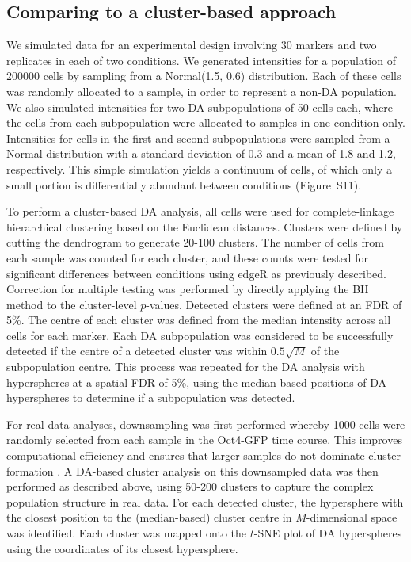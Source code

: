 \documentclass{article}
\newcommand{\suppfigclustersim}{S11}
\begin{document}
\subsection{Comparing to a cluster-based approach}
We simulated data for an experimental design involving 30 markers and two replicates in each of two conditions.
We generated intensities for a population of 200000 cells by sampling from a Normal(1.5, 0.6) distribution.
Each of these cells was randomly allocated to a sample, in order to represent a non-DA population.
We also simulated intensities for two DA subpopulations of 50 cells each, where the cells from each subpopulation were allocated to samples in one condition only.
Intensities for cells in the first and second subpopulations were sampled from a Normal distribution with a standard deviation of 0.3 and a mean of 1.8 and 1.2, respectively.
This simple simulation yields a continuum of cells, of which only a small portion is differentially abundant between conditions (Figure~\suppfigclustersim{}).

To perform a cluster-based DA analysis, all cells were used for complete-linkage hierarchical clustering based on the Euclidean distances.
Clusters were defined by cutting the dendrogram to generate 20-100 clusters.
The number of cells from each sample was counted for each cluster, and these counts were tested for significant differences between conditions using edgeR as previously described.
Correction for multiple testing was performed by directly applying the BH method to the cluster-level $p$-values.
Detected clusters were defined at an FDR of 5\%.
The centre of each cluster was defined from the median intensity across all cells for each marker.
Each DA subpopulation was considered to be successfully detected if the centre of a detected cluster was within $0.5\sqrt{M}$ of the subpopulation centre.
This process was repeated for the DA analysis with hyperspheres at a spatial FDR of 5\%, using the median-based positions of DA hyperspheres to determine if a subpopulation was detected.

For real data analyses, downsampling was first performed whereby 1000 cells were randomly selected from each sample in the Oct4-GFP time course.
This improves computational efficiency and ensures that larger samples do not dominate cluster formation \cite{bruggner2014automated}.
A DA-based cluster analysis on this downsampled data was then performed as described above, using 50-200 clusters to capture the complex population structure in real data.
For each detected cluster, the hypersphere with the closest position to the (median-based) cluster centre in $M$-dimensional space was identified.
Each cluster was mapped onto the $t$-SNE plot of DA hyperspheres using the coordinates of its closest hypersphere.
\end{document}
